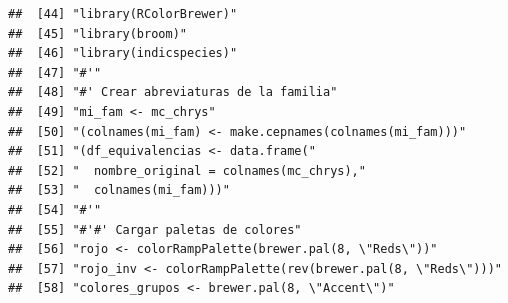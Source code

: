 \documentclass[11pt,]{article}
\begin{document}
\begin{verbatim}
##  [44] "library(RColorBrewer)"                                                                                                                                                 
##  [45] "library(broom)"                                                                                                                                                        
##  [46] "library(indicspecies)"                                                                                                                                                 
##  [47] "#'"                                                                                                                                                                    
##  [48] "#' Crear abreviaturas de la familia"                                                                                                                                   
##  [49] "mi_fam <- mc_chrys"                                                                                                                                                    
##  [50] "(colnames(mi_fam) <- make.cepnames(colnames(mi_fam)))"                                                                                                                 
##  [51] "(df_equivalencias <- data.frame("                                                                                                                                      
##  [52] "  nombre_original = colnames(mc_chrys),"                                                                                                                               
##  [53] "  colnames(mi_fam)))"                                                                                                                                                  
##  [54] "#'"                                                                                                                                                                    
##  [55] "#'#' Cargar paletas de colores"                                                                                                                                        
##  [56] "rojo <- colorRampPalette(brewer.pal(8, \"Reds\"))"                                                                                                                     
##  [57] "rojo_inv <- colorRampPalette(rev(brewer.pal(8, \"Reds\")))"                                                                                                            
##  [58] "colores_grupos <- brewer.pal(8, \"Accent\")"                                                                                                                           

\end{verbatim}
\end{document}
